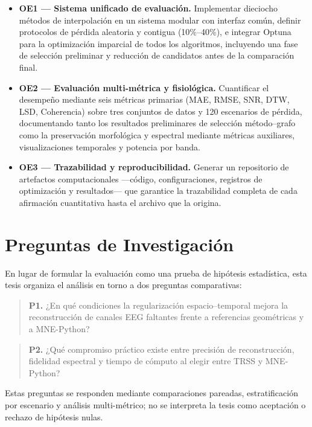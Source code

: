 \begin{itemize}
  \item \textbf{OE1 — Sistema unificado de evaluación.} Implementar dieciocho métodos de interpolación en un sistema modular con interfaz común, definir protocolos de pérdida aleatoria y contigua (10\%--40\%), e integrar Optuna para la optimización imparcial de todos los algoritmos, incluyendo una fase de selección preliminar y reducción de candidatos antes de la comparación final.

  \item \textbf{OE2 — Evaluación multi-métrica y fisiológica.} Cuantificar el desempeño mediante seis métricas primarias (MAE, RMSE, SNR, DTW, LSD, Coherencia) sobre tres conjuntos de datos y 120 escenarios de pérdida, documentando tanto los resultados preliminares de selección método--grafo como la preservación morfológica y espectral mediante métricas auxiliares, visualizaciones temporales y potencia por banda.

  \item \textbf{OE3 — Trazabilidad y reproducibilidad.} Generar un repositorio de artefactos computacionales —código, configuraciones, registros de optimización y resultados— que garantice la trazabilidad completa de cada afirmación cuantitativa hasta el archivo que la origina.
\end{itemize}

\section{Preguntas de Investigación}

En lugar de formular la evaluación como una prueba de hipótesis estadística, esta tesis organiza el análisis en torno a dos preguntas comparativas:

\begin{quote}
\textbf{P1.} ¿En qué condiciones la regularización espacio--temporal mejora la reconstrucción de canales EEG faltantes frente a referencias geométricas y a MNE-Python?
\end{quote}

\begin{quote}
\textbf{P2.} ¿Qué compromiso práctico existe entre precisión de reconstrucción, fidelidad espectral y tiempo de cómputo al elegir entre TRSS y MNE-Python?
\end{quote}

Estas preguntas se responden mediante comparaciones pareadas, estratificación por escenario y análisis multi-métrico; no se interpreta la tesis como aceptación o rechazo de hipótesis nulas.
